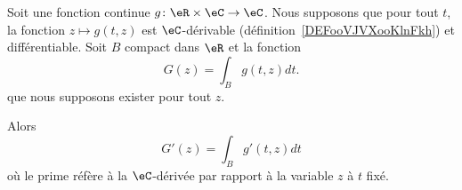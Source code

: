 \begin{proposition}     \label{PROPooZCLYooUaSMWA}
	Soit une fonction continue \( g\colon \eR\times \eC\to \eC\). Nous supposons que pour tout \( t\), la fonction \( z\mapsto g(t,z)\) est \( \eC\)-dérivable (définition~\ref{DEFooVJVXooKlnFkh}) et différentiable. Soit \( B\) compact dans \( \eR\) et la fonction
	\begin{equation}
		G(z)=\int_B g(t,z)dt.
	\end{equation}
	que nous supposons exister pour tout \( z\).

	Alors
	\begin{equation}
		G'(z)=\int_Bg'(t,z)dt
	\end{equation}
	où le prime réfère à la \( \eC\)-dérivée par rapport à la variable \( z\) à \( t\) fixé.
\end{proposition}

